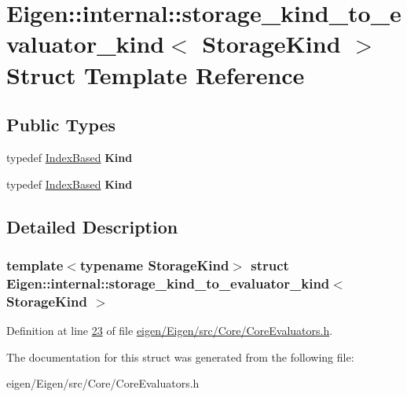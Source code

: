 \hypertarget{struct_eigen_1_1internal_1_1storage__kind__to__evaluator__kind}{}\section{Eigen\+:\+:internal\+:\+:storage\+\_\+kind\+\_\+to\+\_\+evaluator\+\_\+kind$<$ Storage\+Kind $>$ Struct Template Reference}
\label{struct_eigen_1_1internal_1_1storage__kind__to__evaluator__kind}
\subsection*{Public Types}
\begin{DoxyCompactItemize}
\item 
\mbox{\label{struct_eigen_1_1internal_1_1storage__kind__to__evaluator__kind_a2b890b9b3391c22ebdeb3aa778967fe8}} 
typedef \hyperlink{struct_eigen_1_1internal_1_1_index_based}{Index\+Based} {\bfseries Kind}
\item 
\mbox{\label{struct_eigen_1_1internal_1_1storage__kind__to__evaluator__kind_a2b890b9b3391c22ebdeb3aa778967fe8}} 
typedef \hyperlink{struct_eigen_1_1internal_1_1_index_based}{Index\+Based} {\bfseries Kind}
\end{DoxyCompactItemize}


\subsection{Detailed Description}
\subsubsection*{template$<$typename Storage\+Kind$>$\newline
struct Eigen\+::internal\+::storage\+\_\+kind\+\_\+to\+\_\+evaluator\+\_\+kind$<$ Storage\+Kind $>$}



Definition at line \hyperlink{eigen_2_eigen_2src_2_core_2_core_evaluators_8h_source_l00023}{23} of file \hyperlink{eigen_2_eigen_2src_2_core_2_core_evaluators_8h_source}{eigen/\+Eigen/src/\+Core/\+Core\+Evaluators.\+h}.



The documentation for this struct was generated from the following file\+:\begin{DoxyCompactItemize}
\item 
eigen/\+Eigen/src/\+Core/\+Core\+Evaluators.\+h\end{DoxyCompactItemize}
